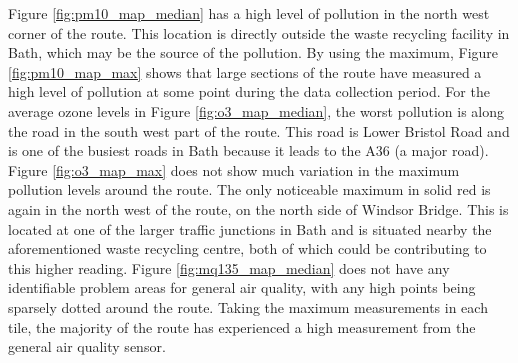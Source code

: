 \documentclass[11pt]{report}
\begin{document}
Figure \ref{fig:pm10_map_median} has a high level of pollution in the north west corner of the route. This location is directly outside the waste recycling facility in Bath, which may be the source of the pollution. By using the maximum, Figure \ref{fig:pm10_map_max} shows that large sections of the route have measured a high level of pollution at some point during the data collection period. For the average ozone levels in Figure \ref{fig:o3_map_median}, the worst pollution is along the road in the south west part of the route. This road is Lower Bristol Road and is one of the busiest roads in Bath because it leads to the A36 (a major road). Figure \ref{fig:o3_map_max} does not show much variation in the maximum pollution levels around the route. The only noticeable maximum in solid red is again in the north west of the route, on the north side of Windsor Bridge. This is located at one of the larger traffic junctions in Bath and is situated nearby the aforementioned waste recycling centre, both of which could be contributing to this higher reading. Figure \ref{fig:mq135_map_median} does not have any identifiable problem areas for general air quality, with any high points being sparsely dotted around the route. Taking the maximum measurements in each tile, the majority of the route has experienced a high measurement from the general air quality sensor.
\end{document}
